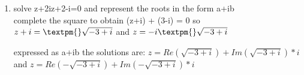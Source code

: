 \documentclass[11pt]{article}
\begin{document}
\begin{enumerate}
\item solve z+2iz+2-i=0 and represent the roots in the form a+ib\\

complete the square to obtain
(z+i) + (3-i) = 0
so \(z+i = \textpm{}\sqrt{-3+i}\) and \(z = -i \textpm{} \sqrt{-3+i}\)

expressed as a+ib the solutions are:
\(z = Re(\sqrt{-3+i}) + Im(\sqrt{-3+i})*i\) and
\(z = Re(-\sqrt{-3+i}) + Im(-\sqrt{-3+i})*i\)
\end{enumerate}
\end{document}
